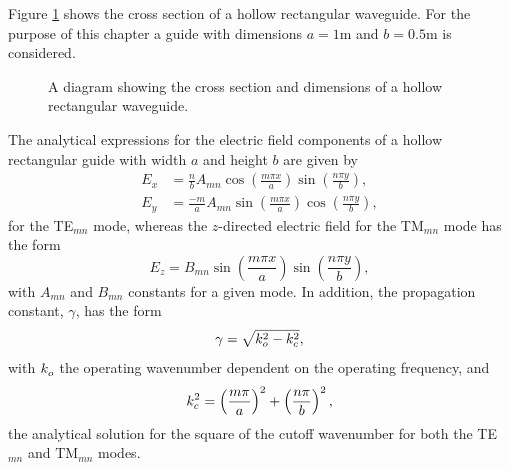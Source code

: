 Figure \ref{fig:hollow_rectangular_guide} shows the cross section of a
hollow rectangular waveguide. For the purpose of this chapter a guide
with dimensions $a = 1\text{m}$ and $b = 0.5\text{m}$ is considered.
\begin{figure}[ht]
    \centering
    \caption{A diagram showing the cross section and dimensions of a hollow rectangular waveguide.}
    \label{fig:hollow_rectangular_guide}
\end{figure}
The analytical expressions for the electric field components of a
hollow rectangular guide with width $a$ and height $b$ are given
by~\cite{Poz2005}
\begin{align}
    \label{eqn:rect:E_x analytical}
    E_x &= \frac{n}{b}A_{mn}\cos\left(\frac{m\pi
    x}{a}\right)\sin\left(\frac{n\pi y}{b}\right),\\
    \label{eqn:rect:E_y analytical}
    E_y &= \frac{-m}{a}A_{mn}\sin\left(\frac{m\pi x}{a}\right)\cos\left(\frac{n\pi y}{b}\right),
\end{align}
for the TE$_{mn}$ mode, whereas the $z$-directed electric field for the TM$_{mn}$ mode has the form~\cite{Poz2005}
\begin{equation}
 \label{eqn:rect_E_z_analytical}
 E_z = B_{mn}\sin\left(\frac{m\pi x}{a}\right)\sin\left(\frac{n\pi y}{b}\right),
\end{equation}
with $A_{mn}$ and $B_{mn}$ constants for a given mode.
In addition, the propagation constant, $\gamma$, has the form
\begin{equation}
 \label{eqn:rectangular_propagation}
 \gamma = \sqrt{k_{o}^{2} - k_{c}^{2}},
\end{equation}
with $k_{o}^{}$ the operating wavenumber dependent on the operating frequency, and
\begin{equation}
 \label{eqn:rectangular_cutoff}
 k_{c}^{2} = \left(\frac{m\pi}{a}\right)^2 + \left(\frac{n\pi}{b}\right)^2,
\end{equation}
the analytical solution for the square of the cutoff wavenumber for both the TE$_{mn}$ and TM$_{mn}$ modes.

